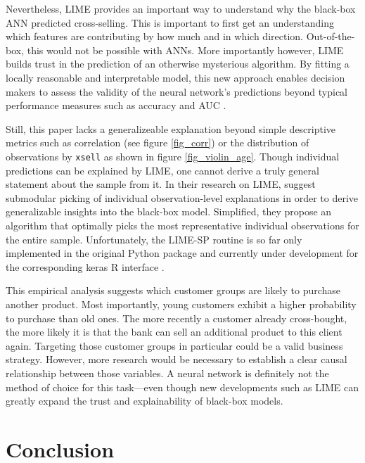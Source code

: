 \documentclass[12pt,a4paper]{article}
\newcommand{\pkg}[1]{{\normalfont\fontseries{b}\selectfont #1}}
\let\proglang=\textsf
\let\code=\texttt
\begin{document}
Nevertheless, LIME  provides an important way to understand why the black-box ANN predicted cross-selling.
This is important to first get an understanding which features are contributing by how much and in which direction.
Out-of-the-box, this would not be possible with ANNs.
More importantly however, LIME builds trust in the prediction of an otherwise mysterious algorithm.
By fitting a locally reasonable and interpretable model, this new approach enables decision makers to assess the validity of the neural network's 
predictions beyond typical performance measures such as accuracy and AUC \citep{ribeiroWhyShouldTrust2016a}.

Still, this paper lacks a generalizeable explanation beyond simple descriptive metrics such as correlation (see figure \ref{fig_corr}) or the distribution of observations by \code{xsell} as shown in figure \ref{fig_violin_age}.
Though individual predictions can be explained by LIME, one cannot derive a truly general statement about the sample from it.
In their research on LIME, \cite{ribeiroWhyShouldTrust2016a} suggest submodular picking of individual observation-level explanations in order to 
derive generalizable insights into the black-box model.
Simplified, they propose an algorithm that optimally picks the most representative individual observations for the entire sample.
Unfortunately, the LIME-SP routine is so far only implemented in the original \proglang{Python} package and currently under development for the corresponding  \pkg{keras} \proglang{R} interface \citep{kavickyLocalInterpretableModelAgnostic2017}. 

This empirical analysis suggests which customer groups are likely to purchase another product.
Most importantly, young customers exhibit a higher probability to purchase than old ones. The more recently a customer already cross-bought,
the more likely it is that the bank can sell an additional product to this client again.
Targeting those customer groups in particular could be a valid business strategy.
However, more research would be necessary to establish a clear causal relationship between those variables.
A neural network is definitely not the method of choice for this task---even though new developments such as LIME can greatly expand the trust and explainability of black-box models.

\section{Conclusion}
\end{document}
